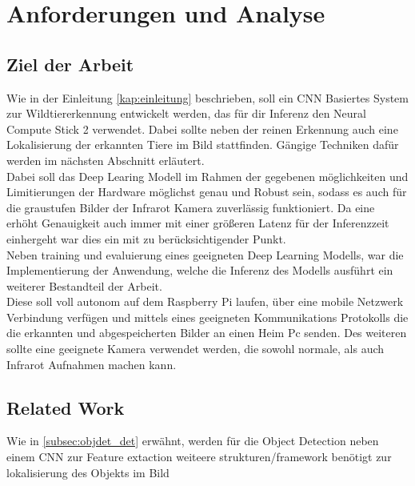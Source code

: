 \chapter{Anforderungen und Analyse}\label{kap:anforderunganalyse}

\section{Ziel der Arbeit}\label{sec:zielderarbeit}


Wie in der Einleitung \ref{kap:einleitung} beschrieben, soll 
ein CNN Basiertes System zur Wildtiererkennung entwickelt 
werden, das für dir Inferenz den Neural Compute Stick 2 verwendet.
Dabei sollte neben der reinen Erkennung auch eine Lokalisierung 
der erkannten Tiere im Bild stattfinden. Gängige Techniken dafür 
werden im nächsten Abschnitt erläutert.
\\
Dabei soll das Deep Learing Modell im Rahmen der gegebenen 
möglichkeiten und Limitierungen der Hardware möglichst 
genau und Robust sein, sodass es auch für die graustufen 
Bilder der Infrarot Kamera zuverlässig funktioniert.
Da eine erhöht Genauigkeit auch immer mit einer größeren
Latenz für der Inferenzzeit einhergeht war dies ein mit 
zu berücksichtigender Punkt.
\\
Neben training und evaluierung eines geeigneten Deep Learning Modells,
war die Implementierung der Anwendung, welche die Inferenz 
des Modells ausführt ein weiterer Bestandteil der Arbeit.
\\
Diese soll voll autonom auf dem Raspberry Pi laufen,
über eine mobile Netzwerk Verbindung verfügen und 
mittels eines geeigneten Kommunikations Protokolls die 
die erkannten und abgespeicherten Bilder an einen
Heim Pc senden.
Des weiteren sollte eine geeignete Kamera verwendet werden, die 
sowohl normale, als auch Infrarot Aufnahmen machen kann.


\section{Related Work}\label{sec:related_work}



Wie in \ref{subsec:objdet_det} erwähnt, werden für die 
Object Detection neben einem CNN zur Feature extaction 
weiteere strukturen/framework benötigt zur lokalisierung 
des Objekts im Bild

